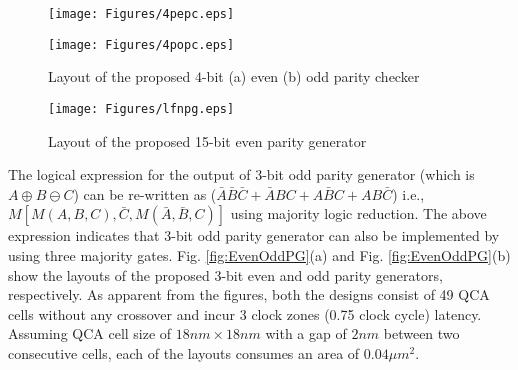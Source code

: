 \documentclass[conference]{IEEEtran}
\begin{document}
\begin{figure}[ht]
\hspace{-0.8cm}
\begin{minipage}[b]{0.4\linewidth}
\centering
\vspace{-1cm}
\texttt{[image: Figures/4pepc.eps]}
\vspace{-1cm}
\end{minipage}
\hspace{0.7cm}
\begin{minipage}[b]{0.4\linewidth}
\centering
\vspace{-1cm}
\texttt{[image: Figures/4popc.eps]}
\vspace{-1cm}
\end{minipage}
\vspace{-1cm}
\caption{\small Layout of the proposed $4$-bit (a) even (b) odd parity checker}
\label{fig:EvenOddPC}
\end{figure}
\begin{figure*}[htb]
\vspace{-1.0 cm}
\texttt{[image: Figures/lfnpg.eps]}
\vspace{-2.1 cm}
\caption{\small Layout of the proposed 15-bit even parity generator}
\label{fig:ExEvenPG}
\end{figure*}
The logical expression for the output of $3$-bit odd parity generator (which is $A\oplus B\ominus C$)  can be re-written as ($\bar{A}\bar{B}\bar{C}+\bar{A}BC+A\bar{B}C+AB\bar{C}$) i.e., $  M[{M({A},{B},{C})},\bar{C}, M(\bar{A},\bar{B},{C})]$ using majority logic reduction.
The above expression indicates that $3$-bit odd parity generator can also be implemented by using three majority gates.
Fig. \ref{fig:EvenOddPG}(a) and  Fig. \ref{fig:EvenOddPG}(b) show the layouts of the proposed $3$-bit even and odd parity generators, respectively.
As apparent from the figures, both the designs consist of 49 QCA cells without any crossover and incur 3 clock zones (0.75 clock cycle) latency.
Assuming QCA cell size of $18nm \times 18nm$ with a gap of $2nm$ between two consecutive cells, each of the layouts consumes an area of $0.04\mu m^2$.
\end{document}
